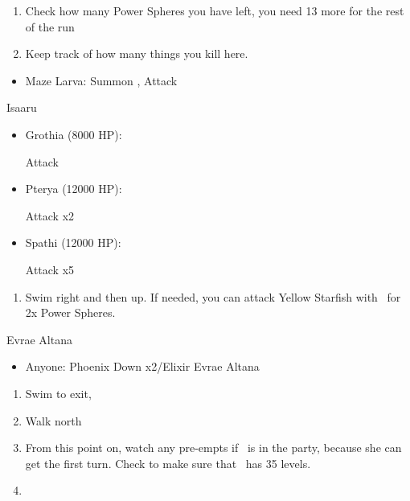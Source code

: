 \begin{spheregrid}
\begin{itemize}
  \end{itemize}
\end{spheregrid}
\begin{enumerate}[resume]
  \item Check how many Power Spheres you have left, you need 13 more for the rest of the run
  \item Keep track of how many things you kill here.
\end{enumerate}
\begin{encounters}
  \begin{itemize}
    \item Maze Larva: Summon \ixilon, Attack
  \end{itemize}
\end{encounters}
\begin{battle}{Isaaru}
  \begin{itemize}
    \item Grothia (8000 HP):
          \begin{itemize}
            \summon{\bahamut}
            \bahamutf Attack
          \end{itemize}
    \item Pterya (12000 HP):
          \begin{itemize}
            \summon{\bahamut}
            \bahamutf Attack x2
          \end{itemize}
    \item Spathi (12000 HP):
          \begin{itemize}
            \summon{\ixilon}
            \ixilonf Attack x5
          \end{itemize}
  \end{itemize}
\end{battle}
\begin{enumerate}[resume]
  \item Swim right and then up. If needed, you can attack Yellow Starfish with \tidus\ for 2x Power Spheres.
\end{enumerate}
\begin{battle}{Evrae Altana}
  \begin{itemize}
    \item Anyone: Phoenix Down x2/Elixir Evrae Altana
  \end{itemize}
\end{battle}
\begin{enumerate}[resume]
  \item Swim to exit, \sd
  \item Walk north
  \item From this point on, watch any pre-empts if \yuna\ is in the party, because she can get the first turn. Check to make sure that \lulu\ has 35 levels.
  \item \formation{\tidus}{\yuna}{\auron}
\end{enumerate}
